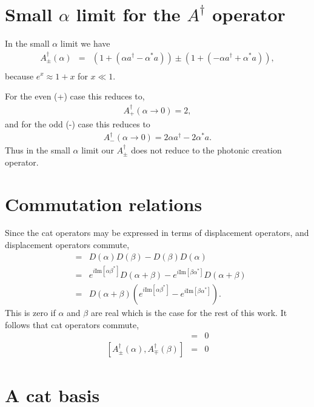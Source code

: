 \documentclass[aps,prl,twocolumn,amsmath,amssymb,nofootinbib,superscriptaddress]{revtex4}
\begin{document}
\section{Small $\alpha$ limit for the $A^\dag$ operator}

In the small $\alpha$ limit we have
\begin{eqnarray}
A^\dag_\pm(\alpha)  &=& (1+(\alpha a^\dag - \alpha^* a)) \pm (1+(-\alpha a^\dag + \alpha^* a)),\nonumber \\
\end{eqnarray}
because $e^{x}\approx 1+x$ for $x\ll1$.

For the even (+) case this reduces to,
\begin{eqnarray}
A^\dag_+(\alpha\to 0) = 2,
\end{eqnarray}
and for the odd (-) case this reduces to
\begin{eqnarray}
A^\dag_-(\alpha\to 0) = 2\alpha a^\dag - 2\alpha^* a.
\end{eqnarray}
Thus in the small $\alpha$ limit our $A^\dag_\pm$ does not reduce to the photonic creation operator.

\section{Commutation relations}

Since the cat operators may be expressed in terms of displacement operators, and displacement operators commute, 
\begin{eqnarray}
[D(\alpha),D(\beta)] &=& D(\alpha)D(\beta)-D(\beta)D(\alpha) \nonumber \\
&=& e^{i \mathrm{Im}[\alpha \beta^*]}D(\alpha+\beta)-e^{i \mathrm{Im}[\beta \alpha^*]}D(\alpha+\beta) \nonumber \\
&=& D(\alpha+\beta)\left(e^{i \mathrm{Im}[\alpha \beta^*]}- e^{i \mathrm{Im}[\beta \alpha^*]}\right).
\end{eqnarray}
This is zero if $\alpha$ and $\beta$ are real which is the case for the rest of this work. It follows that cat operators commute,
\begin{eqnarray}
[A_\pm^\dag(\alpha), A_\pm^\dag(\beta)] &=& 0 \\ \nonumber
[A_\pm^\dag(\alpha), A_\mp^\dag(\beta)] &=& 0 
\end{eqnarray}

\section{A cat basis}
\end{document}

